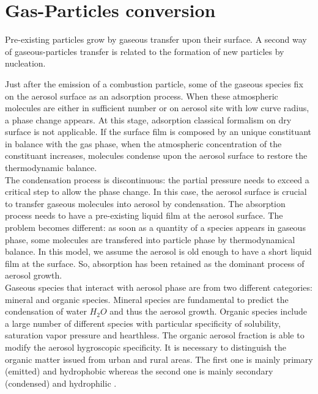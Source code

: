 \section{Gas-Particles conversion}

Pre-existing particles grow by gaseous transfer upon their surface. A second way 
of gaseous-particles transfer is related to the formation of new particles by 
nucleation.

Just after the emission of a combustion particle, some of the gaseous species 
fix on the aerosol surface as an adsorption process. When these atmospheric 
molecules are either in sufficient number or on aerosol site with low curve 
radius, a phase change appears. At this stage, adsorption classical formalism on
dry surface is not applicable. If the surface film is composed by an unique 
constituant in balance with the gas phase, when the atmospheric concentration of 
the constituant increases,
molecules condense upon the aerosol surface to restore
the thermodynamic balance.\\
The condensation process is discontinuous: the partial pressure needs to exceed 
a critical step to allow the phase change. In this case, the aerosol 
surface is crucial to transfer gaseous molecules into aerosol by condensation.
The absorption process needs to have a pre-existing liquid film at the aerosol 
surface.
The problem becomes different: as soon as a quantity of a species appears in 
gaseous
phase, some molecules are transfered into particle phase by thermodynamical 
balance. In this model, we assume the aerosol is old enough to have a short
liquid film at the surface. 
So, absorption has been retained as the dominant process
of aerosol growth.\\
Gaseous species that interact with aerosol phase are from two different 
categories: mineral and organic species. Mineral species are fundamental to 
predict the condensation of water $H_2O$ and thus the aerosol growth.
Organic species include a large number of different 
species with particular specificity of solubility, saturation vapor pressure and hearthless.
The organic aerosol fraction is able to modify the aerosol hygroscopic 
specificity. It is necessary to distinguish the organic matter issued from urban 
and rural areas. The first one  is mainly primary (emitted) and hydrophobic 
whereas the second one is mainly secondary (condensed) and hydrophilic 
\citep{Saxena-1995}.

